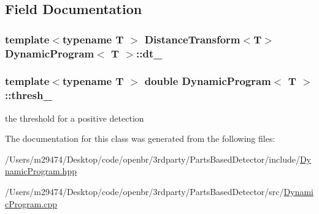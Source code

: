 \subsection{Field Documentation}
\hypertarget{class_dynamic_program_a6cea0b8559d6a03d81e2003991ab67cf}{
\subsubsection[{dt\-\_\-}]{\setlength{\rightskip}{0pt plus 5cm}template$<$typename T $>$ {\bf Distance\-Transform}$<$T$>$ {\bf Dynamic\-Program}$<$ T $>$\-::dt\-\_\-\hspace{0.3cm}{\ttfamily [private]}}}\label{class_dynamic_program_a6cea0b8559d6a03d81e2003991ab67cf}
\hypertarget{class_dynamic_program_a08f2d4801faa0f964e217b9ac9927ec6}{
\subsubsection[{thresh\-\_\-}]{\setlength{\rightskip}{0pt plus 5cm}template$<$typename T $>$ double {\bf Dynamic\-Program}$<$ T $>$\-::thresh\-\_\-\hspace{0.3cm}{\ttfamily [private]}}}\label{class_dynamic_program_a08f2d4801faa0f964e217b9ac9927ec6}


the threshold for a positive detection 



The documentation for this class was generated from the following files\-:\begin{DoxyCompactItemize}
\item 
/\-Users/m29474/\-Desktop/code/openbr/3rdparty/\-Parts\-Based\-Detector/include/\hyperlink{_dynamic_program_8hpp}{Dynamic\-Program.\-hpp}\item 
/\-Users/m29474/\-Desktop/code/openbr/3rdparty/\-Parts\-Based\-Detector/src/\hyperlink{_dynamic_program_8cpp}{Dynamic\-Program.\-cpp}\end{DoxyCompactItemize}
